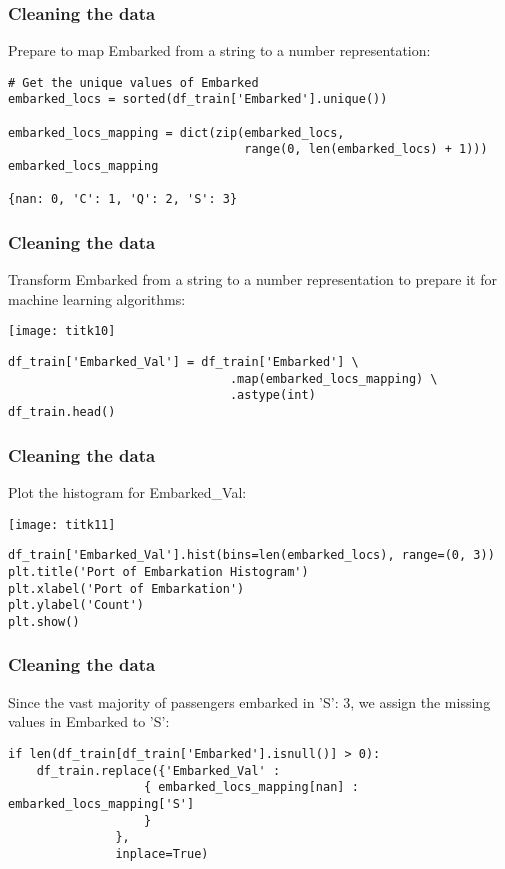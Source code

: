 \begin{frame}[fragile]\frametitle{Cleaning  the data}
Prepare to map Embarked from a string to a number representation:
\begin{lstlisting}
# Get the unique values of Embarked
embarked_locs = sorted(df_train['Embarked'].unique())

embarked_locs_mapping = dict(zip(embarked_locs, 
                                 range(0, len(embarked_locs) + 1)))
embarked_locs_mapping

{nan: 0, 'C': 1, 'Q': 2, 'S': 3}
\end{lstlisting}
\end{frame}

\begin{frame}[fragile]\frametitle{Cleaning  the data}
Transform Embarked from a string to a number representation to prepare it for machine learning algorithms:

\begin{center}
\texttt{[image: titk10]}
\end{center}


\begin{lstlisting}
df_train['Embarked_Val'] = df_train['Embarked'] \
                               .map(embarked_locs_mapping) \
                               .astype(int)
df_train.head()
\end{lstlisting}

\end{frame}

\begin{frame}[fragile]\frametitle{Cleaning  the data}
Plot the histogram for Embarked\_Val:

\begin{center}
\texttt{[image: titk11]}
\end{center}

\begin{lstlisting}
df_train['Embarked_Val'].hist(bins=len(embarked_locs), range=(0, 3))
plt.title('Port of Embarkation Histogram')
plt.xlabel('Port of Embarkation')
plt.ylabel('Count')
plt.show()
\end{lstlisting}


\end{frame}

\begin{frame}[fragile]\frametitle{Cleaning  the data}
Since the vast majority of passengers embarked in 'S': 3, we assign the missing values in Embarked to 'S':
\begin{lstlisting}
if len(df_train[df_train['Embarked'].isnull()] > 0):
    df_train.replace({'Embarked_Val' : 
                   { embarked_locs_mapping[nan] : embarked_locs_mapping['S'] 
                   }
               }, 
               inplace=True)
\end{lstlisting}
\end{frame}

